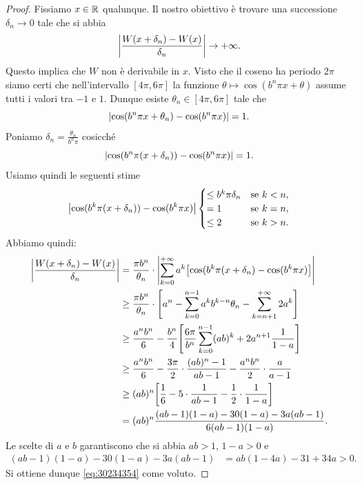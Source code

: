 \begin{proof}
Fissiamo $x\in {\mathbb R}$ qualunque. 
Il nostro obiettivo è trovare una successione $\delta_n\to 0$ 
tale che si abbia
\begin{equation}\label{eq:30234354}
  {\left|\frac{W(x+\delta_n) - W(x)}{\delta_n}\right|} \to +\infty.
\end{equation}
Questo implica che $W$ non è derivabile in $x$.
Visto che il coseno ha periodo $2\pi$ siamo certi che nell'intervallo 
$[4\pi,6\pi]$ la funzione $\theta \mapsto \cos(b^n \pi x+\theta)$ 
assume tutti i valori tra $-1$ e $1$. 
Dunque esiste $\theta_n \in [4\pi,6\pi]$ tale che 
\[
   {\left|\cos (b^n \pi x + \theta_n) - \cos(b^n\pi x)\right|} = 1.
\]
Poniamo $\delta_n = \frac{\theta_n}{b^n \pi}$ cosicché
\[
  {\left|\cos (b^n \pi (x+\delta_n))- \cos(b^n \pi x)\right|} = 1.
\]
Usiamo quindi le seguenti stime
\[
  {\left|\cos(b^k\pi (x + \delta_n)) - \cos(b^k \pi x)\right|}
  \begin{cases}
    \le b^k\pi\delta_n &\text{se $k<n$},\\
    = 1 &\text{se $k=n$},\\
    \le 2 &\text{se $k>n$}.
  \end{cases}
\]
Abbiamo quindi:
\begin{align*}
    {\left|\frac{W(x+\delta_n) - W(x)}{\delta_n}\right|} 
    &= \frac{\pi b^n}{\theta_n}\cdot {\left|\sum_{k=0}^{+\infty}a^k{\left[ \cos(b^k\pi (x + \delta_n) - \cos(b^k \pi x) \right]}\right|}  \\
    &\ge \frac{\pi b^n}{\theta_n}\cdot {\left[ a^n - \sum_{k=0}^{n-1} a^k b^{k-n} \theta_n - \sum_{k=n+1}^{+\infty} 2a^k \right]} \\
    &\ge \frac{a^n b^n}{6} - \frac{b^n}{4}{\left[ \frac{6\pi}{b^n}\sum_{k=0}^{n-1} (ab)^k + 2 a^{n+1} \frac{1}{1-a} \right]} \\
    &\ge \frac{a^n b^n}{6} -\frac {3\pi} 2\cdot  \frac{(ab)^n-1}{ab-1} - \frac{a^n b^n}{2}\cdot \frac{a}{a-1}\\
    &\ge (ab)^n {\left[ \frac 1 6 - 5\cdot \frac{1}{ab-1} - \frac 1 2 \cdot \frac{1}{1-a} \right]} \\
    &= (ab)^n \frac{(ab-1)(1-a)-30(1-a)-3a(ab-1)}{6(ab-1)(1-a)}.
\end{align*}
Le scelte di $a$ e $b$ garantiscono che
si abbia $ab>1$, $1-a>0$ e
\begin{align*}
(ab-1)(1-a)-30(1-a)-3a(ab-1)
&= ab(1-4a) - 31 + 34a > 0.
\end{align*}
Si ottiene dunque \eqref{eq:30234354} come voluto.
\end{proof}
